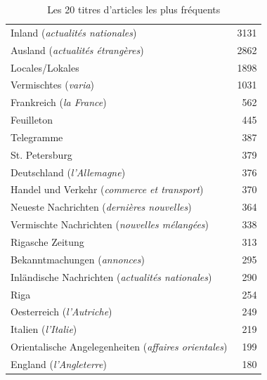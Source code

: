 \documentclass[a4paper,twoside,12pt]{article}
\begin{document}
\begin{table}[h]
    \centering
    \footnotesize
    \begin{tabular}{|l|r|}
    \hline
         Inland (\textit{actualités nationales}) & 3131 \\
         Ausland (\textit{actualités étrangères}) & 2862 \\
         Locales/Lokales & 1898 \\
         Vermischtes (\textit{varia}) & 1031 \\
         Frankreich (\textit{la France}) & 562 \\
         Feuilleton & 445 \\
         Telegramme & 387 \\
         St. Petersburg & 379 \\
         Deutschland (\textit{l'Allemagne}) & 376 \\
         Handel und Verkehr (\textit{commerce et transport}) & 370 \\
         Neueste Nachrichten (\textit{dernières nouvelles}) & 364 \\
         Vermischte Nachrichten (\textit{nouvelles mélangées}) & 338 \\
         Rigasche Zeitung & 313 \\
         Bekanntmachungen (\textit{annonces}) & 295 \\
         Inländische Nachrichten (\textit{actualités nationales}) & 290 \\
         Riga & 254 \\
         Oesterreich (\textit{l'Autriche}) & 249 \\
         Italien (\textit{l'Italie}) & 219 \\
         Orientalische Angelegenheiten (\textit{affaires orientales}) & 199 \\
         England (\textit{l'Angleterre}) & 180 \\
    \hline
    \end{tabular}
    \caption{Les 20 titres d'articles les plus fréquents}
    \label{tab:article_titles}
\end{table}

\clearpage
\end{document}
